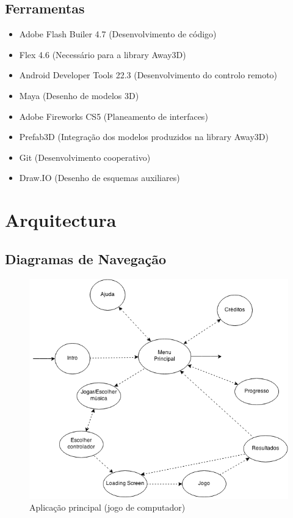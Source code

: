 \documentclass{article}
\begin{document}
\subsection{Ferramentas}
\begin{itemize}
\item Adobe Flash Builer 4.7 (Desenvolvimento de código)
\item Flex 4.6 (Necessário para a library Away3D)
\item Android Developer Tools 22.3 (Desenvolvimento do controlo remoto)
\item Maya (Desenho de modelos 3D)
\item Adobe Fireworks CS5 (Planeamento de interfaces)
\item Prefab3D (Integração dos modelos produzidos na library Away3D)
\item Git (Desenvolvimento cooperativo)
\item Draw.IO (Desenho de esquemas auxiliares)
\end{itemize}

\section{Arquitectura}
\subsection{Diagramas de Navegação}
\begin{figure}[H]
\begin{center}
\includegraphics[scale=0.5]{Navigation.png}
\end{center}
\caption{Aplicação principal (jogo de computador)}
\end{figure}
\end{document}
